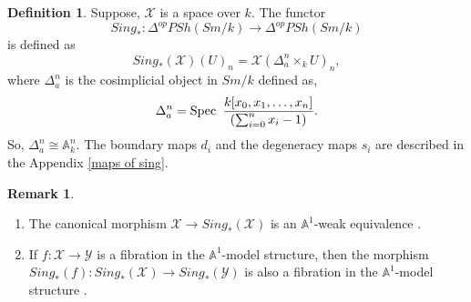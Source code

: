 \documentclass[11pt, reqno]{amsart}
\theoremstyle{plain}
\theoremstyle{definition}
\newtheorem{remark}[thm]{Remark}
\newtheorem{definition}[thm]{Definition}
\newtheorem{example}[thm]{Example}
\newcommand{\Spec}{{\rm Spec \,}}
\newcommand{\A}{{\mathbb A}}
\begin{document}
        
       


\begin{definition} \cite[Section 2.3]{mv} \label{sing functor}
Suppose, $\mathcal{X}$ is a space over $k$.
The functor 
$$Sing_*: \Delta^{op}PSh(Sm/k) \to \Delta^{op}PSh(Sm/k)$$ 
is defined as
$$Sing_*(\mathcal{X})(U)_n=\mathcal{X}(\Delta^n_a \times_k U)_n,$$
where $\Delta^n_a$ is the cosimplicial object in $Sm/k$ defined as, 
$$\Delta^n_a = \Spec\ \frac{k[x_0, x_1,\dots, x_n]}{(\sum_{i=0}^n x_i - 1)}.$$ 
So, $\Delta^n_a \cong \mathbb{A}^n_k$. The boundary maps $d_i$ and the degeneracy maps $s_i$ are described in the Appendix \ref{maps of sing}.
\end{definition}

\begin{remark}
\begin{enumerate}
\item The canonical morphism $\mathcal{X} \to Sing_*(\mathcal{X})$ is an $\mathbb{A}^1$-weak equivalence \cite[Corollary 3.8, Section 2.3]{mv}.
\item If $f: \mathcal{X} \to \mathcal{Y}$ is 
a fibration in the $\A^1$-model structure, then the morphism $Sing_*(f): Sing_*(\mathcal{X}) \to Sing_*(\mathcal{Y})$ is also a fibration in the $\A^1$-model structure
\cite[Corollary 3.13, Section 2.3]{mv}.
\end{enumerate}
\end{remark}
\end{document}
